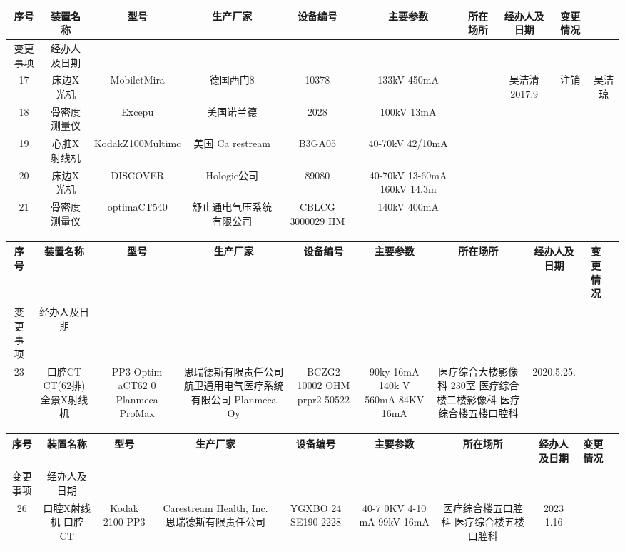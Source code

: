 \begin{table}[H]
\centering
\begin{tabular}{|c|c|c|c|c|c|c|c|c|c|}
\hline
序号 & 装置名称 & 型号 & 生产厂家 & 设备编号 & 主要参数 & 所在场所 & 经办人及日期 & 变更情况 &  \\
\hline
变更事项 & 经办人及日期 &  &  &  &  &  &  &  &  \\
\hline
17 & 床边X光机 & MobiletMira & 德国西门8 & 10378 & 133kV 450mA &  & 吴洁清 2017.9 & 注销 & 吴洁琼 \\
\hline
18 & 骨密度测量仪 & Excepu & 美国诺兰德 & 2028 & 100kV 13mA &  &  &  &  \\
\hline
19 & 心脏X射线机 & KodakZ100Multimc & 美国 Ca restream & B3GA05 & 40-70kV 42/10mA &  &  &  &  \\
\hline
20 & 床边X光机 & DISCOVER & Hologic公司 & 89080 & 40-70kV 13-60mA 160kV 14.3m &  &  &  &  \\
\hline
21 & 骨密度测量仪 & optimaCT540 & 舒止通电气压系统有限公司 & CBLCG 3000029 HM & 140kV 400mA &  &  &  &  \\
\hline
\end{tabular}
\end{table}


\begin{table}[H]
\centering
\begin{tabular}{|c|c|c|c|c|c|c|c|c|c|}
\hline
序号 & 装置名称 & 型号 & 生产厂家 & 设备编号 & 主要参数 & 所在场所 & 经办人及日期 & 变更情况 &  \\
\hline
变更事项 & 经办人及日期 &  &  &  &  &  &  &  &  \\
\hline
23 & 口腔CT CT(62排) 全景X射线机 & PP3 Optim aCT62 0 Planmeca ProMax & 思瑞德斯有限责任公司 航卫通用电气医疗系统有限公司 Planmeca Oy & BCZG2 10002 OHM prpr2 50522 & 90ky 16mA 140k V 560mA 84KV 16mA & 医疗综合大楼影像科 230室 医疗综合楼二楼影像科 医疗综合楼五楼口腔科 & 2020.5.25. &  &  \\
\hline
\end{tabular}
\end{table}


\begin{table}[H]
\centering
\begin{tabular}{|c|c|c|c|c|c|c|c|c|c|}
\hline
序号 & 装置名称 & 型号 & 生产厂家 & 设备编号 & 主要参数 & 所在场所 & 经办人及日期 & 变更情况 &  \\
\hline
变更事项 & 经办人及日期 &  &  &  &  &  &  &  &  \\
\hline
26 & 口腔X射线机 口腔CT & Kodak 2100 PP3 & Carestream Health, Inc. 思瑞德斯有限责任公司 & YGXBO 24 SE190 2228 & 40-7 0KV 4-10 mA 99kV 16mA & 医疗综合楼五口腔科 医疗综合楼五楼口腔科 & 2023 1.16 &  &  \\
\hline
\end{tabular}
\end{table}


